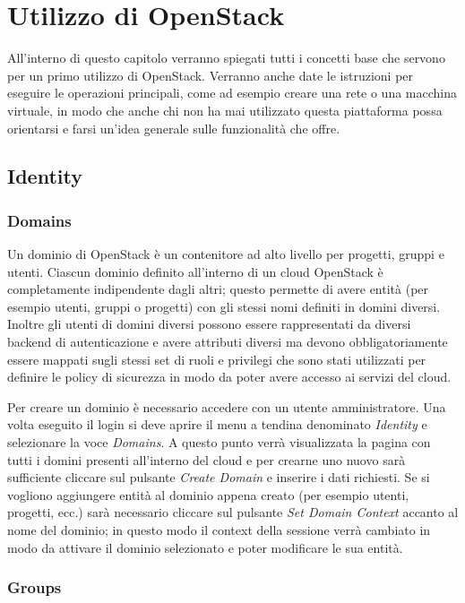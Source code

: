 \chapter{Utilizzo di OpenStack}\label{sec:openstack_usage}

All'interno di questo capitolo verranno spiegati tutti i concetti base che servono per un primo utilizzo di OpenStack. Verranno anche date le istruzioni per eseguire le operazioni principali, come ad esempio creare una rete o una macchina virtuale, in modo che anche chi non ha mai utilizzato questa piattaforma possa orientarsi e farsi un'idea generale sulle funzionalità che offre.

\section{Identity}

\subsection{Domains}

Un dominio di OpenStack è un contenitore ad alto livello per progetti, gruppi e utenti. Ciascun dominio definito all'interno di un cloud OpenStack è completamente indipendente dagli altri; questo permette di avere entità (per esempio utenti, gruppi o progetti) con gli stessi nomi definiti in domini diversi. Inoltre gli utenti di domini diversi possono essere rappresentati da diversi backend di autenticazione e avere attributi diversi ma devono obbligatoriamente essere mappati sugli stessi set di ruoli e privilegi che sono stati utilizzati per definire le policy di sicurezza in modo da poter avere accesso ai servizi del cloud.

Per creare un dominio è necessario accedere con un utente amministratore. Una volta eseguito il login si deve aprire il menu a tendina denominato \textit{Identity} e selezionare la voce \textit{Domains}. A questo punto verrà visualizzata la pagina con tutti i domini presenti all'interno del cloud e per crearne uno nuovo sarà sufficiente cliccare sul pulsante \textit{Create Domain} e inserire i dati richiesti. Se si vogliono aggiungere entità al dominio appena creato (per esempio utenti, progetti, ecc.) sarà necessario cliccare sul pulsante \textit{Set Domain Context} accanto al nome del dominio; in questo modo il context della sessione verrà cambiato in modo da attivare il dominio selezionato e poter modificare le sua entità.

\subsection{Groups}

